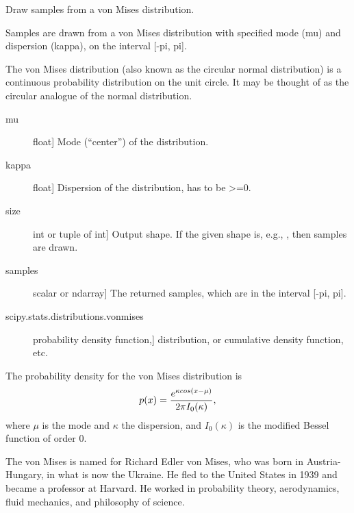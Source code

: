 \documentclass[letterpaper,10pt,english]{sphinxmanual}
\begin{document}
\begin{fulllineitems}
\label{pygeomod:pygeomod.geomodeller_xml_obj.vonmises}
Draw samples from a von Mises distribution.

Samples are drawn from a von Mises distribution with specified mode
(mu) and dispersion (kappa), on the interval {[}-pi, pi{]}.

The von Mises distribution (also known as the circular normal
distribution) is a continuous probability distribution on the unit
circle.  It may be thought of as the circular analogue of the normal
distribution.
\begin{description}
\item[{mu}] \leavevmode{[}float{]}
Mode (``center'') of the distribution.

\item[{kappa}] \leavevmode{[}float{]}
Dispersion of the distribution, has to be \textgreater{}=0.

\item[{size}] \leavevmode{[}int or tuple of int{]}
Output shape.  If the given shape is, e.g., , then
 samples are drawn.

\end{description}
\begin{description}
\item[{samples}] \leavevmode{[}scalar or ndarray{]}
The returned samples, which are in the interval {[}-pi, pi{]}.

\end{description}
\begin{description}
\item[{scipy.stats.distributions.vonmises}] \leavevmode{[}probability density function,{]}
distribution, or cumulative density function, etc.

\end{description}

The probability density for the von Mises distribution is
\begin{gather}
\begin{split}p(x) = \frac{e^{\kappa cos(x-\mu)}}{2\pi I_0(\kappa)},\end{split}\notag
\end{gather}
where \(\mu\) is the mode and \(\kappa\) the dispersion,
and \(I_0(\kappa)\) is the modified Bessel function of order 0.

The von Mises is named for Richard Edler von Mises, who was born in
Austria-Hungary, in what is now the Ukraine.  He fled to the United
States in 1939 and became a professor at Harvard.  He worked in
probability theory, aerodynamics, fluid mechanics, and philosophy of
science.


\end{fulllineitems}
\end{document}
